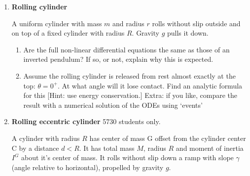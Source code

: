 \documentclass[11pt]{article}
\def\tight{ \setlength{\itemsep}{1.5pt}\setlength{\parskip}{0pt}\setlength{\parsep}{0pt}}
\begin{document}
\begin{enumerate}
Calculate the acceleration of the end of the second link in terms of the two sets, and their
derivatives.  (This is \textit{kinematics} only.  There is no place here for force, moment, free-body diagrams, mass, linear momentum,
angular momentum,  or energy.) 

\begin{itemize}
\item For the first set do this, as we have done before, by considering a non-rotating frame
that moves with the end of the first link.  This involves basic polar coordinate formulas. 


\item  For the second set, consider a reference frame that is glued to the first link. Then use
the `5-term acceleration formula' to calculate the acceleration of the end of the second link.


\end{itemize}

Show that the two methods give the same answer.





\item{\bf Rolling cylinder}\label{HWrollingcyllinder}

A uniform cylinder with mass $m$ and radius $r$ rolls without slip outside and on top of a fixed cylinder
with radius $R$.  Gravity $g$ pulls it down. 

\begin{enumerate}\tight
\item Are the full non-linear differential equations the same as those of an inverted pendulum?
If so, or not, explain why this is expected.
\item  Assume the rolling cylinder is released from rest almost exactly at the top:   $\theta= 0^+$. At what
angle will it lose contact.  Find an analytic formula for this [Hint: use energy conservation.]  Extra: if you like, compare the result with a numerical solution of the ODEs using `events'
\end{enumerate}


\item \textbf{Rolling eccentric cylinder} \label{HWcylinder}
5730 students only.

A cylinder with radius $R$ has center of mass G offset from
the cylinder center C by a distance $d<R$. It has total mass $M$, radius $R$ and moment of inertia
$I^G$ about it's center of mass.   It rolls without slip down a ramp
with slope $\gamma$ (angle relative to horizontal), propelled by gravity $g$.



\end{enumerate}
\end{document}
